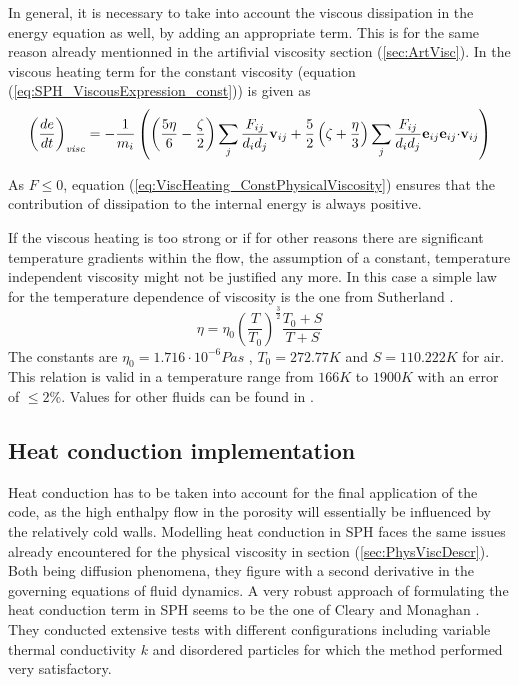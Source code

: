 \documentclass{report}
\begin{document}
In general, it is necessary to take into account the viscous dissipation in the energy equation as well, by adding an appropriate term. This is for the same reason already mentionned in the artifivial viscosity section (\ref{sec:ArtVisc}). In \cite{Espanol2003} the viscous heating term for the constant viscosity (equation (\ref{eq:SPH_ViscousExpression_const})) is given as 
\begin{equation}
\label{eq:ViscHeating_ConstPhysicalViscosity}
 \left(\frac{de}{dt}\right)_{\mathit{visc}}=-\frac{1}{m_i}\left(\left(\frac{5\eta}{6}-\frac{\zeta}{2}\right)\sum_j\frac{F_{ij}}{d_i d_j}{\bf v}_{ij}+\frac{5}{2} \left(\zeta+\frac{\eta}{3}\right) \sum_j\frac{F_{ij}}{d_i d_j}{\bf e}_{ij} {\bf e}_{ij}{\bf \cdot v}_{ij}\right)
\end{equation}

As $ F\leq 0$, equation (\ref{eq:ViscHeating_ConstPhysicalViscosity}) ensures that the contribution of dissipation to the internal energy is always positive.

If the viscous heating is too strong or if for other reasons 
there are significant temperature gradients within the flow, the assumption of a constant, temperature independent viscosity might not be justified any more. In this case a simple law for the temperature dependence of viscosity is the one from Sutherland \cite{White1974}.
\begin{equation}
\eta=\eta_0 \left(\frac{T}{T_0}\right)^{\frac{3}{2}}\frac{T_0+S}{T+S}
\end{equation}
The constants are $\eta_0=1.716\cdot10^{-6}Pa s$
, $T_0=272.77K$ and $S=110.222K$ for air. This relation is valid in a temperature range from $166K$ to $1900K$ with an error of $\leq2\%$.
Values for other fluids can be found in \cite{White1974}.

\subsection{Heat conduction implementation}
\label{sec:HeatCondImplementation}
Heat conduction has to be taken into account for the final application of the code, as the high enthalpy flow in the porosity will essentially be influenced by the relatively cold walls. 
Modelling heat conduction in SPH faces the same issues already encountered for the physical viscosity  in section (\ref{sec:PhysViscDescr}). Both being diffusion phenomena, they figure with a second derivative in the governing equations of fluid dynamics. 
A very robust approach of formulating the heat conduction term in SPH seems to be the one of Cleary and Monaghan \cite{Cleary1999}. They conducted extensive tests with different configurations including variable thermal conductivity $k$ and disordered particles for which the method performed very satisfactory.
\end{document}
